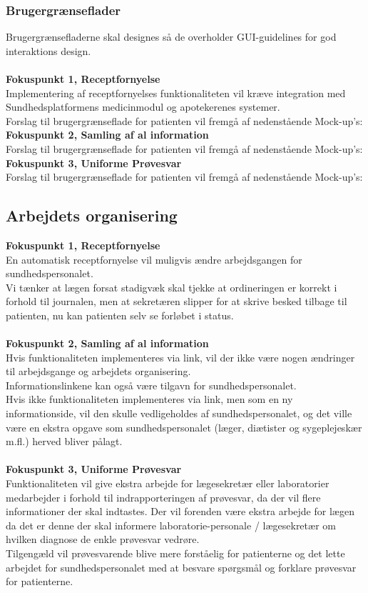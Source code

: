  \subsubsection{Brugergrænseflader} %
 Brugergrænsefladerne skal designes så de overholder GUI-guidelines for god interaktions design. %
 \\\\
 \textbf{Fokuspunkt 1, Receptfornyelse} \\
 Implementering af receptfornyelses funktionaliteten vil kræve integration med Sundhedsplatformens medicinmodul og apotekerenes systemer.\\ 
 Forslag til brugergrænseflade for patienten vil fremgå af nedenstående Mock-up's:\\
 \textbf{Fokuspunkt 2, Samling af al information} \\
 Forslag til brugergrænseflade for patienten vil fremgå af nedenstående Mock-up's:\\
 \textbf{Fokuspunkt 3, Uniforme Prøvesvar} \\
 Forslag til brugergrænseflade for patienten vil fremgå af nedenstående Mock-up's:\\
  \subsection{Arbejdets organisering}
\textbf{Fokuspunkt 1, Receptfornyelse} \\
En automatisk receptfornyelse vil muligvis ændre arbejdsgangen for sundhedspersonalet. \\ 
Vi tænker at lægen forsat stadigvæk skal tjekke at ordineringen er korrekt i forhold til journalen, men at sekretæren slipper for at skrive besked tilbage til patienten, nu kan patienten selv se forløbet i status.
\\\\
\textbf{Fokuspunkt 2, Samling af al information} \\
Hvis funktionaliteten implementeres via link, vil der ikke være nogen ændringer til arbejdsgange og arbejdets organisering. \\
Informationslinkene kan også være tilgavn for sundhedspersonalet. \\
Hvis ikke funktionaliteten implementeres via link, men som en ny informationside, vil den skulle vedligeholdes af sundhedspersonalet, og det ville være en ekstra opgave som sundhedspersonalet (læger, diætister og sygeplejeskær m.fl.) herved bliver pålagt.
\\\\
\textbf{Fokuspunkt 3, Uniforme Prøvesvar} \\
Funktionaliteten vil give ekstra arbejde for lægesekretær eller laboratorier medarbejder i forhold til indrapporteringen af prøvesvar, da der vil flere informationer der skal indtastes. Der vil forenden være ekstra arbejde for lægen da det er denne der skal informere laboratorie-personale / lægesekretær om hvilken diagnose de enkle prøvesvar vedrøre.\\
Tilgengæld vil prøvesvarende blive mere forståelig for patienterne og det lette arbejdet for sundhedspersonalet med at besvare spørgsmål og forklare prøvesvar for patienterne.
